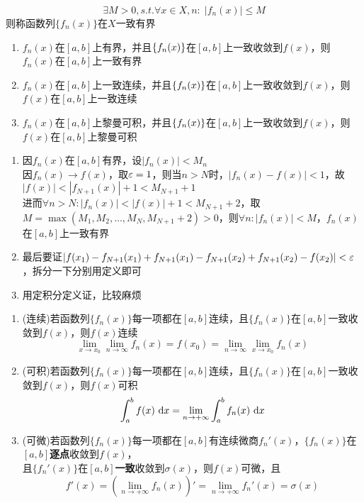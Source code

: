 \begin{definition}[一致有界]
\[\exists M>0, s.t. \forall x\in X,n:\;|f_n(x)|\leq M\]
则称函数列$\{f_n(x)\}$在$X$一致有界
\end{definition}
\begin{theorem}
\begin{enumerate}
	\item $f_n(x)$在$[a,b]$上有界，并且$\{f_n(x)\}$在$[a,b]$上一致收敛到$f(x)$，则$f_n(x)$在$[a,b]$上一致有界
	\item $f_n(x)$在$[a,b]$上一致连续，并且$\{f_n(x)\}$在$[a,b]$上一致收敛到$f(x)$，则$f(x)$在$[a,b]$上一致连续
	\item $f_n(x)$在$[a,b]$上黎曼可积，并且$\{f_n(x)\}$在$[a,b]$上一致收敛到$f(x)$，则$f(x)$在$[a,b]$上黎曼可积
\end{enumerate}
\end{theorem}
\begin{analysis}
\begin{enumerate}
	\item 因$f_n(x)$在$[a,b]$有界，设$|f_n(x)|<M_n$\\
	因$f_n(x)\to f(x)$，取$\varepsilon=1$，则当$n>N$时，$|f_n(x)-f(x)|<1$，故$|f(x)|<|f_{N+1}(x)|+1<M_{N+1}+1$\\
	进而$\forall n>N:|f_n(x)|<|f(x)|+1<M_{N+1}+2$，取$M=\max(M_1,M_2,\ldots,M_N,M_{N+1}+2)>0$，则$\forall n:|f_n(x)|<M$，$f_n(x)$在$[a,b]$上一致有界
	\item 最后要证$|f(x_1)-f_{N+1}(x_1)+f_{N+1}(x_1)-f_{N+1}(x_2)+f_{N+1}(x_2)-f(x_2)|<\varepsilon$，拆分一下分别用定义即可
	\item 用定积分定义证，比较麻烦
\end{enumerate}
\end{analysis}
\begin{theorem}[函数列的分析性质]
\begin{enumerate}
	\itemsep -3pt
	\item (连续)若函数列$\{f_n(x)\}$每一项都在$[a,b]$连续，且$\{f_n(x)\}$在$[a,b]$一致收敛到$f(x)$，则$f(x)$连续
	\[\displaystyle\lim_{x\to x_0}\lim_{n\to\infty}f_n(x)=f(x_0)=\lim_{n\to\infty}\lim_{x\to x_0}f_n(x)\]
	\item (可积)若函数列$\{f_n(x)\}$每一项都在$[a,b]$连续，且$\{f_n(x)\}$在$[a,b]$一致收敛到$f(x)$，则$f(x)$可积
	\[\displaystyle\int_{a}^{b}{f(x)}\,\,\mathrm{d} x=\displaystyle\lim_{n\to+\infty}\displaystyle\int_{a}^{b}{f_n(x)}\,\,\mathrm{d} x\]
	\item (可微)若函数列$\{f_n(x)\}$每一项都在$[a,b]$有连续微商$f_n'(x)$，$\{f_n(x)\}$在$[a,b]$\textbf{逐点}收敛到$f(x)$，\\
	且$\{f_n'(x)\}$在$[a,b]$\textbf{一致}收敛到$\sigma(x)$，则$f(x)$可微，且
	\[\displaystyle f'(x)=(\lim_{n\to+\infty}f_n(x))'=\lim_{n\to+\infty}f_n'(x)=\sigma(x)\]
\end{enumerate}
\end{theorem}
